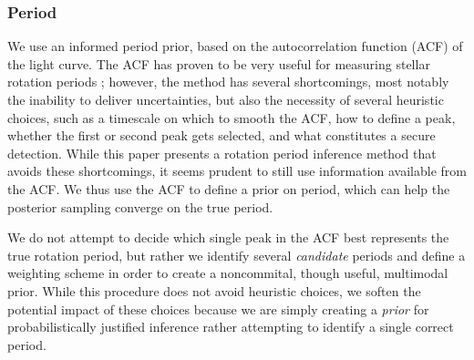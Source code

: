 \documentclass[useAMS, usenatbib, preprint, 12pt]{aastex}
\begin{document}

\subsubsection{Period}
\label{sec:period_prior}

We use an informed period prior, based on the autocorrelation function (ACF)
of the light curve.
The ACF has proven to be very useful for measuring stellar rotation periods
\citep{Mcquillan2012, Mcquillan13b, Mcquillan2014}; however, the
method has several shortcomings,
most notably the inability to deliver uncertainties, but also
the necessity of several heuristic choices,
such as a timescale on which to smooth the ACF,
how to define a peak, whether the first or second peak
gets selected, and what constitutes a secure detection.
While this paper presents a rotation period inference method
that avoids these shortcomings,
it seems prudent to still use information available from the ACF.
We thus use the ACF to define a prior on period,
which can help the posterior sampling converge on the true period.

We do not attempt to decide which single
peak in the ACF best represents the true rotation period,
but rather we identify several \emph{candidate} periods and define
a weighting scheme in order to create a noncommital, though useful,
multimodal prior.  While this procedure does not avoid heuristic choices,
we soften the potential impact of these choices because we are simply
creating a \emph{prior} for probabilistically justified
inference rather attempting to identify a single correct period.
\end{document}

